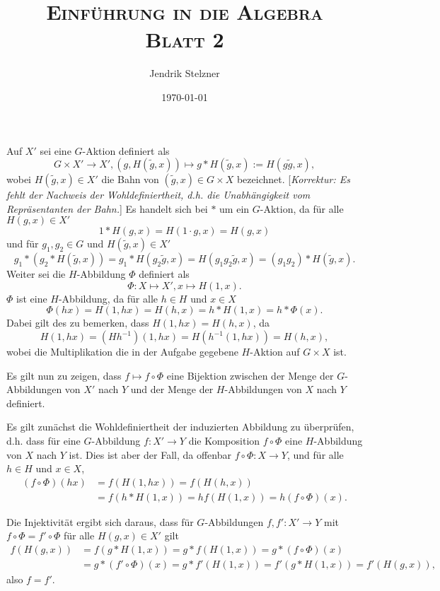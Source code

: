 \documentclass[a4paper,10pt]{article}
\title{\textsc{Einführung in die Algebra \\ \Large Blatt 2}}
\author{Jendrik Stelzner}
\date{\today}
\theoremstyle{definition}
\begin{document}
\maketitle





\section{}
Auf $X'$ sei eine $G$-Aktion definiert als
\[
 G \times X' \rightarrow X', (g,H(\tilde{g},x)) \mapsto g * H(\tilde{g},x) := H(g \tilde{g}, x),
\]
wobei $H(\tilde{g},x) \in X'$ die Bahn von $(\tilde{g},x) \in G \times X$ bezeichnet. [\emph{Korrektur: Es fehlt der Nachweis der Wohldefiniertheit, d.h. die Unabhängigkeit vom Repräsentanten der Bahn.}] Es handelt sich bei $*$ um ein $G$-Aktion, da für alle $H(g,x) \in X'$
\[
 1 * H(g,x) = H(1 \cdot g, x) = H(g,x)
\]
und für $g_1, g_2 \in G$ und $H(\tilde{g},x) \in X'$
\[
 g_1 * (g_2 * H(\tilde{g},x))
 = g_1 * H(g_2 \tilde{g}, x)
 = H(g_1 g_2 \tilde{g}, x)
 = (g_1 g_2) * H(\tilde{g},x).
\]
Weiter sei die $H$-Abbildung $\Phi$ definiert als
\[
 \Phi : X \mapsto X', x \mapsto H(1,x).
\]
$\Phi$ ist eine $H$-Abbildung, da für alle $h \in H$ und $x \in X$
\[
 \Phi(hx) = H(1,hx) = H(h,x) = h * H(1,x) = h * \Phi(x).
\]
Dabei gilt des zu bemerken, dass $H(1,hx) = H(h,x)$, da
\[
 H(1,hx) = (H h^{-1}) (1,hx) = H (h^{-1}(1,hx)) = H(h,x),
\]
wobei die Multiplikation die in der Aufgabe gegebene $H$-Aktion auf $G \times X$ ist.

Es gilt nun zu zeigen, dass $f \mapsto f \circ \Phi$ eine Bijektion zwischen der Menge der $G$-Abbildungen von $X'$ nach $Y$ und der Menge der $H$-Abbildungen von $X$ nach $Y$ definiert.

Es gilt zunächst die Wohldefiniertheit der induzierten Abbildung zu überprüfen, d.h. dass für eine $G$-Abbildung $f : X' \rightarrow Y$ die Komposition $f \circ \Phi$ eine $H$-Abbildung von $X$ nach $Y$ ist. Dies ist aber der Fall, da offenbar $f \circ \Phi : X \rightarrow Y$, und für alle $h \in H$ und $x \in X$,
\begin{align*}
 (f \circ \Phi)(hx)
 &= f( H(1,hx) )
 = f( H(h,x) ) \\
 &= f(h * H(1,x) )
 = h f( H(1,x) )
 = h (f \circ \Phi)(x).
\end{align*}

Die Injektivität ergibt sich daraus, dass für $G$-Abbildungen $f, f' : X' \rightarrow Y$ mit $f \circ \Phi = f' \circ \Phi$ für alle $H(g,x) \in X'$ gilt
\begin{align*}
 f( H(g,x) )
 &= f( g * H(1,x) )
 = g * f( H(1,x) )
 = g * (f \circ \Phi)(x) \\
 &= g * (f' \circ \Phi)(x)
 = g * f'( H(1,x) )
 = f'( g * H(1,x) )
 = f'( H(g,x) ),
\end{align*}
also $f = f'$.
\end{document}
